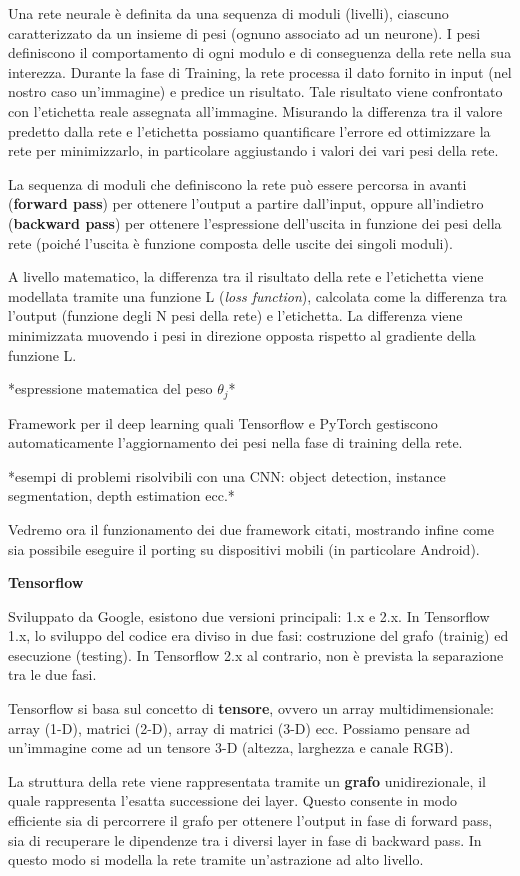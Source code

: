 \documentclass[a4paper,oneside]{book}
\begin{document}
    Una rete neurale è definita da una sequenza di moduli
    (livelli), ciascuno caratterizzato da un insieme di pesi (ognuno associato ad un neurone). 
    I pesi definiscono il comportamento di ogni modulo e di conseguenza della rete nella sua interezza. 
    Durante la fase di Training, la rete processa il dato fornito in input (nel nostro caso un'immagine)
    e predice un risultato. Tale risultato viene confrontato con l'etichetta reale assegnata all'immagine. 
    Misurando la differenza tra il valore predetto dalla rete e l'etichetta possiamo quantificare l'errore 
    ed ottimizzare la rete per minimizzarlo, in particolare aggiustando i valori dei vari pesi della rete.

    La sequenza di moduli che definiscono la rete può essere percorsa
    in avanti (\textbf{forward pass}) per ottenere l'output a partire dall'input,
    oppure all'indietro (\textbf{backward pass}) per ottenere l'espressione
    dell'uscita in funzione dei pesi della rete (poiché l'uscita è funzione composta
    delle uscite dei singoli moduli).

    A livello matematico, la differenza tra il risultato della rete e l'etichetta viene modellata tramite una funzione L 
    (\textit{loss function}), calcolata come la differenza tra l'output (funzione degli N pesi della rete) e l'etichetta. 
    La differenza viene minimizzata muovendo i pesi in direzione opposta rispetto al gradiente della funzione L.

    *espressione matematica del peso $\theta_j$*

    Framework per il deep learning quali Tensorflow e PyTorch gestiscono automaticamente 
    l'aggiornamento dei pesi nella fase di training della rete.

    *esempi di problemi risolvibili con una CNN: object detection, instance segmentation, depth estimation ecc.*

    Vedremo ora il funzionamento dei due framework citati, mostrando infine
    come sia possibile eseguire il porting su dispositivi mobili (in particolare Android).

    \textbf{Tensorflow}

    Sviluppato da Google, esistono due versioni principali:
    1.x e 2.x.
    In Tensorflow 1.x, lo sviluppo del codice era diviso in 
    due fasi: costruzione del grafo (trainig) ed esecuzione (testing).
    In Tensorflow 2.x al contrario, non è prevista la separazione tra le due fasi.

    Tensorflow si basa sul concetto di \textbf{tensore}, ovvero
    un array multidimensionale: array (1-D), matrici (2-D), array di matrici (3-D) ecc.
    Possiamo pensare ad un'immagine come ad un tensore 3-D (altezza, larghezza e
    canale RGB).

    La struttura della rete viene rappresentata tramite un \textbf{grafo} unidirezionale,
    il quale rappresenta l'esatta successione dei layer. Questo consente in modo efficiente
    sia di percorrere il grafo per ottenere l'output in fase di forward pass,
    sia di recuperare le dipendenze tra i diversi layer in fase di backward pass.
    In questo modo si modella la rete tramite un'astrazione ad alto livello.

        
\end{document}
